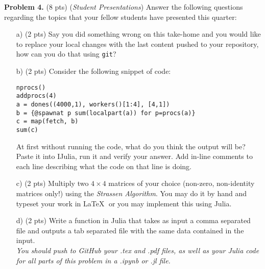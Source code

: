 \documentclass[12pt]{article}
\begin{document}
{\bf Problem 4. }(8 pts) (\emph{Student Presentations}) Answer the following questions regarding the topics that your fellow students have presented this quarter:
\begin{enumerate}
\item[a) ](2 pts) Say you did something wrong on this take-home and you would like to replace your local changes with the last content pushed to your repository, how can you do that using \verb+git+?
\item[b) ](2 pts) Consider the following snippet of code:
\begin{verbatim}
nprocs()
addprocs(4)
a = dones((4000,1), workers()[1:4], [4,1])
b = {@spawnat p sum(localpart(a)) for p=procs(a)}
c = map(fetch, b)
sum(c)
\end{verbatim}
At first without running the code, what do you think the output will be? Paste it into IJulia, run it and verify your answer. Add in-line comments to each line describing what the code on that line is doing.
\newpage
\item[c) ](2 pts) Multiply two $4 \times 4$ matrices of your choice (non-zero, non-identity matrices only!) using the \emph{Strassen Algorithm}. You may do it by hand and typeset your work in \LaTeX $\;$ or you may implement this using Julia.
\item[d) ](2 pts) Write a function in Julia that takes as input a comma separated file and outputs a tab separated file with the same data contained in the input. \\

\emph{\color{magenta} You should push to GitHub your .tex and .pdf files, as well as your Julia code for all parts of this problem in a .ipynb or .jl file.}\\

\end{enumerate}
\end{document}
